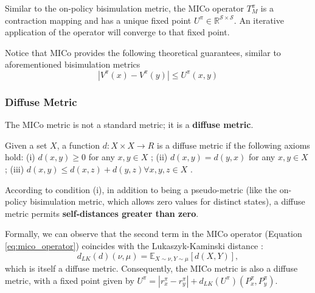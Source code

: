 Similar to the on-policy bisimulation metric, the MICo operator $T^\pi_M$ is a contraction mapping and has a unique fixed point $U^\pi \in \mathbb{R}^{\mathcal{S} \times \mathcal{S}}$. An iterative application of the operator will converge to that fixed point.

Notice that MICo provides the following theoretical guarantees, similar to aforementioned bisimulation metrics
\begin{equation}
    | V^\pi(x) -V^\pi(y) | \leq U^\pi(x,y)
\end{equation}



\subsubsection{Diffuse Metric}

The MICo metric is not a standard metric; it is a \textbf{diffuse metric}.

\begin{definition} 
    Given a set $X$, a function $d : X \times X \rightarrow R$ is a diffuse metric if the following axioms hold: (i) $d(x, y) \geq 0$ for any $x, y \in X$ ; (ii) $d(x, y) = d(y, x)$ for any $x, y \in X$ ; (iii) $d(x, y) \leq d(x, z) + d(y, z) \forall x, y, z \in X$ .
\end{definition}

According to condition (i), in addition to being a pseudo-metric (like the on-policy bisimulation metric, which allows zero values for distinct states), a diffuse metric permits \textbf{self-distances greater than zero}.

Formally, we can observe that the second term in the MICo operator (Equation \ref{eq:mico_operator}) coincides with the Lukaszyk-Kaminski distance \cite{lukaszyk2004new}:
\begin{equation}
    d_{LK}(d)(\nu, \mu) = \mathbb{E}_{X \sim \nu, Y \sim \mu}[d(X,Y)],
\end{equation}
which is itself a diffuse metric. Consequently, the MICo metric is also a diffuse metric, with a fixed point given by $U^\pi = |r^\pi_x - r^\pi_y | + d_{LK}(U^\pi)(P^\pi_x, P^\pi_y)$.


